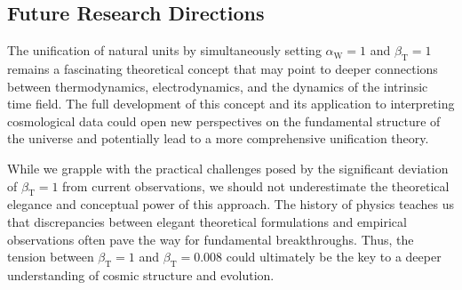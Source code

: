 \documentclass[12pt,a4paper]{article}
\newcommand{\betaT}{\beta_{\text{T}}}
\newcommand{\alphaW}{\alpha_{\text{W}}}
\begin{document}
	\subsection{Future Research Directions}
	
	The unification of natural units by simultaneously setting \(\alphaW = 1\) and \(\betaT = 1\) remains a fascinating theoretical concept that may point to deeper connections between thermodynamics, electrodynamics, and the dynamics of the intrinsic time field. The full development of this concept and its application to interpreting cosmological data could open new perspectives on the fundamental structure of the universe and potentially lead to a more comprehensive unification theory.
	
	While we grapple with the practical challenges posed by the significant deviation of \(\betaT = 1\) from current observations, we should not underestimate the theoretical elegance and conceptual power of this approach. The history of physics teaches us that discrepancies between elegant theoretical formulations and empirical observations often pave the way for fundamental breakthroughs. Thus, the tension between \(\betaT = 1\) and \(\betaT = 0.008\) could ultimately be the key to a deeper understanding of cosmic structure and evolution.
	
\end{document}
